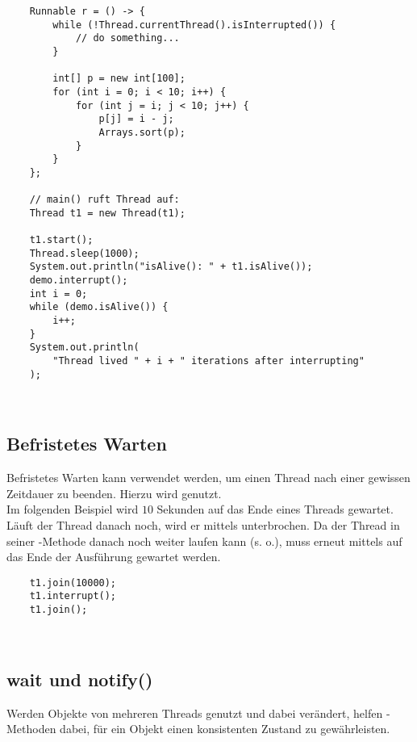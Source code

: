 \begin{verbatim}
    Runnable r = () -> {
        while (!Thread.currentThread().isInterrupted()) {
            // do something...
        }

        int[] p = new int[100];
        for (int i = 0; i < 10; i++) {
            for (int j = i; j < 10; j++) {
                p[j] = i - j;
                Arrays.sort(p);
            }
        }
    };

    // main() ruft Thread auf:
    Thread t1 = new Thread(t1);

    t1.start();
    Thread.sleep(1000);
    System.out.println("isAlive(): " + t1.isAlive());
    demo.interrupt();
    int i = 0;
    while (demo.isAlive()) {
        i++;
    }
    System.out.println(
        "Thread lived " + i + " iterations after interrupting"
    );
\end{verbatim}\\


\subsection*{Befristetes Warten}

Befristetes Warten kann verwendet werden, um einen Thread nach einer gewissen Zeitdauer zu beenden.
Hierzu wird  genutzt.\\
Im folgenden Beispiel wird $10$ Sekunden auf das Ende eines Threads gewartet.
Läuft der Thread danach noch, wird er mittels  unterbrochen.
Da der Thread in seiner  -Methode danach noch weiter laufen kann (s. o.), muss erneut mittels  auf
das Ende der Ausführung gewartet werden.

\begin{verbatim}
    t1.join(10000);
    t1.interrupt();
    t1.join();
\end{verbatim}\\


\subsection{wait und notify()}

Werden Objekte von mehreren Threads genutzt und dabei verändert, helfen -Methoden dabei, für ein Objekt einen konsistenten Zustand zu gewährleisten.\\

